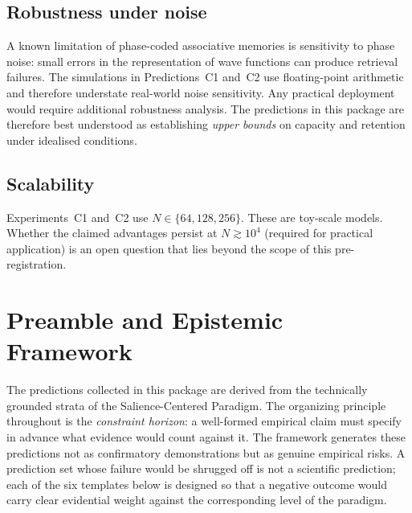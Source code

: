 \documentclass[11pt, a4paper]{article}
\newcommand{\scp}{Salience-Centered Paradigm}
\begin{document}
\subsection{Robustness under noise}

A known limitation of phase-coded associative memories is sensitivity to phase
noise: small errors in the representation of wave functions can produce retrieval
failures.  The simulations in Predictions~C1 and~C2 use floating-point arithmetic
and therefore understate real-world noise sensitivity.  Any practical deployment
would require additional robustness analysis.  The predictions in this package are
therefore best understood as establishing \emph{upper bounds} on capacity and
retention under idealised conditions.

\subsection{Scalability}

Experiments~C1 and~C2 use $N \in \{64, 128, 256\}$.  These are toy-scale models.
Whether the claimed advantages persist at $N \gtrsim 10^4$ (required for practical
application) is an open question that lies beyond the scope of this pre-registration.

\section{Preamble and Epistemic Framework}

The predictions collected in this package are derived from the technically grounded
strata of the \scp{}.  The organizing principle throughout is the
\emph{constraint horizon}: a well-formed empirical claim must specify in advance
what evidence would count against it.  The framework generates these predictions
not as confirmatory demonstrations but as genuine empirical risks.  A prediction
set whose failure would be shrugged off is not a scientific prediction; each of the
six templates below is designed so that a negative outcome would carry clear
evidential weight against the corresponding level of the paradigm.
\end{document}
